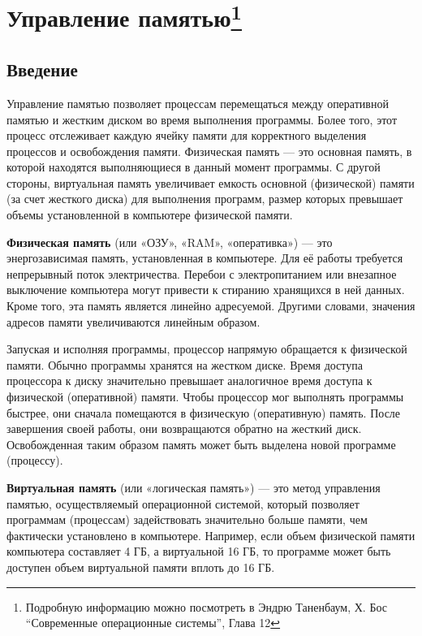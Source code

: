 \documentclass[12pt]{article}
\begin{document}
\section*{Управление памятью\footnote{Подробную информацию можно посмотреть в Эндрю Таненбаум, Х. Бос “Современные операционные системы”, Глава 12}}
\subsection*{Введение}

Управление памятью позволяет процессам перемещаться между оперативной памятью и жестким диском во время выполнения программы.
Более того, этот процесс отслеживает каждую ячейку памяти для корректного выделения процессов и освобождения памяти.
Физическая память — это основная память, в которой находятся выполняющиеся в данный момент программы.
С другой стороны, виртуальная память увеличивает емкость основной (физической) памяти (за счет жесткого диска) для выполнения программ, размер которых превышает объемы установленной в компьютере физической памяти.

\textbf{Физическая память} (или «ОЗУ», «RAM», «оперативка») — это энергозависимая память, установленная в компьютере.
Для её работы требуется непрерывный поток электричества.
Перебои с электропитанием или внезапное выключение компьютера могут привести к стиранию хранящихся в ней данных.
Кроме того, эта память является линейно адресуемой.
Другими словами, значения адресов памяти увеличиваются линейным образом.

Запуская и исполняя программы, процессор напрямую обращается к физической памяти.
Обычно программы хранятся на жестком диске.
Время доступа процессора к диску значительно превышает аналогичное время доступа к физической (оперативной) памяти.
Чтобы процессор мог выполнять программы быстрее, они сначала помещаются в физическую (оперативную) память.
После завершения своей работы, они возвращаются обратно на жесткий диск.
Освобожденная таким образом память может быть выделена новой программе (процессу).

\textbf{Виртуальная память} (или «логическая память») — это метод управления памятью, осуществляемый операционной системой,
который позволяет программам (процессам) задействовать значительно больше памяти, чем фактически установлено в компьютере.
Например, если объем физической памяти компьютера составляет 4 ГБ, а виртуальной 16 ГБ,
то программе может быть доступен объем виртуальной памяти вплоть до 16 ГБ.
\end{document}
